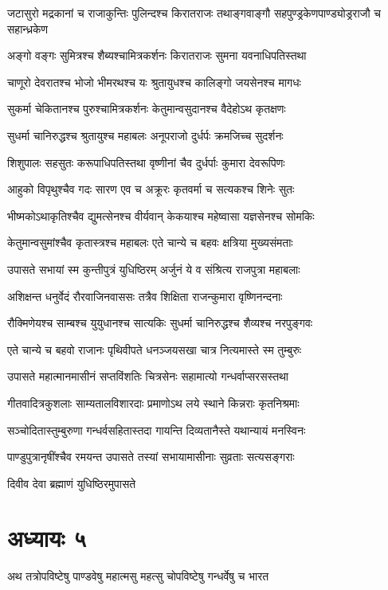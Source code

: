 \twolineshloka
{जटासुरो मद्रकानां च राजाकुन्तिः पुलिन्दश्च किरातराजः}
{तथाङ्गवाङ्गौ सहपुण्ड्रकेणपाण्ड्योड्रराजौ च सहान्ध्रकेण}


\twolineshloka
{अङ्गो वङ्गः सुमित्रश्च शैब्यश्चामित्रकर्शनः}
{किरातराजः सुमना यवनाधिपतिस्तथा}


\twolineshloka
{चाणूरो देवरातश्च भोजो भीमरथश्च यः}
{श्रुतायुधश्च कालिङ्गो जयसेनश्च मागधः}


\twolineshloka
{सुकर्मा चेकितानश्च पुरुश्चामित्रकर्शनः}
{केतुमान्वसुदानश्च वैदेहोऽथ कृतक्षणः}


\twolineshloka
{सुधर्मा चानिरुद्धश्च श्रुतायुश्च महाबलः}
{अनूपराजो दुर्धर्पः क्रमजिच्च सुदर्शनः}


\twolineshloka
{शिशुपालः सहसुतः करूपाधिपतिस्तथा}
{वृष्णीनां चैव दुर्धर्पाः कुमारा देवरूपिणः}


\twolineshloka
{आहुको विपृथुश्चैव गदः सारण एव च}
{अक्रूरः कृतवर्मा च सत्यकश्च शिनेः सुतः}


\twolineshloka
{भीष्मकोऽथाकृतिश्चैव द्युमत्सेनश्च वीर्यवान्}
{केकयाश्च महेष्वासा यज्ञसेनश्च सोमकिः}


\threelineshloka
{केतुमान्वसुमांश्चैव कृतास्त्रश्च महाबलः}
{एते चान्ये च बहवः क्षत्रिया मुख्यसंमताः}
{}


\twolineshloka
{उपासते सभायां स्म कुन्तीपुत्रं युधिष्ठिरम्}
{अर्जुनं ये व संश्रित्य राजपुत्रा महाबलाः}


\threelineshloka
{अशिक्षन्त धनुर्वेदं रौरवाजिनवाससः}
{तत्रैव शिक्षिता राजन्कुमारा वृष्णिनन्दनाः}
{}


\twolineshloka
{रौक्मिणेयश्च साम्बश्च युयुधानश्च सात्यकिः}
{सुधर्मा चानिरुद्धश्च शैव्यश्च नरपुङ्गवः}


\twolineshloka
{एते चान्ये च बहवो राजानः पृथिवीपते}
{धनञ्जयसखा चात्र नित्यमास्ते स्म तुम्बुरुः}


\twolineshloka
{उपासते महात्मानमासीनं सप्तविंशतिः}
{चित्रसेनः सहामात्यो गन्धर्वाप्सरसस्तथा}


\twolineshloka
{गीतवादित्रकुशलाः साम्यतालविशारदाः}
{प्रमाणोऽथ लये स्थाने किन्नराः कृतनिश्रमाः}


\twolineshloka
{सञ्चोदितास्तुम्बुरुणा गन्धर्वसहितास्तदा}
{गायन्ति दिव्यतानैस्ते यथान्यायं मनस्विनः}


\twolineshloka
{पाण्डुपुत्रानृषींश्चैव रमयन्त उपासते}
{तस्यां सभायामासीनाः सुव्रताः सत्यसङ्गराः}


दिवीव देवा ब्रह्माणं युधिष्ठिरमुपासते
\chapter{अध्यायः ५}
\twolineshloka
{अथ तत्रोपविष्टेषु पाण्डवेषु महात्मसु}
{महत्सु चोपविष्टेषु गन्धर्वेषु च भारत}


